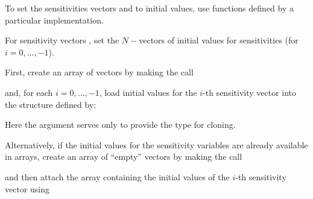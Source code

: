 \begin{Steps}
  To set the sensitivities vectors  and  to initial values,
  use functions defined by a particular {\nvector} implementation. 

  For sensitivity vectors , set the  $N-$vectors 
   of initial values for sensitivities (for $i=0,\ldots,$$-1$). 

  First, create an array of  vectors by making the call

  {\s} 

  {\omp} 

  {\pt} 

  {\p} 

  and, for each $i=0,\ldots,$$-1$, load initial values for the $i$-th sensitivity 
  vector into the structure defined by:

  {\s} 

  {\omp} 

  {\pt} 

  {\p} 

  Here the argument  serves only to provide the  type for cloning.

  Alternatively, if the initial values for the sensitivity variables are already
  available in  arrays, create an array of  ``empty'' vectors
  by making the call

  {\s} 

  {\omp} 

  {\pt} 

  {\p} 

  and then attach the  array  containing the initial values of the
  $i$-th sensitivity vector using

  {\s} 

  {\omp} 
  
  {\pt} 
  
  {\p} 


\end{Steps}
